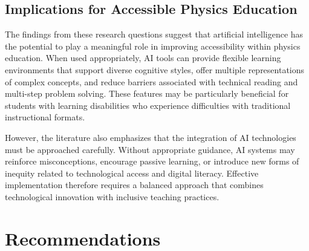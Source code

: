 \documentclass[]{aastex701}
\begin{document}
\subsection{Implications for Accessible Physics Education}

The findings from these research questions suggest that artificial intelligence has the potential to play a meaningful role in improving accessibility within physics education. When used appropriately, AI tools can provide flexible learning environments that support diverse cognitive styles, offer multiple representations of complex concepts, and reduce barriers associated with technical reading and multi-step problem solving. These features may be particularly beneficial for students with learning disabilities who experience difficulties with traditional instructional formats.

However, the literature also emphasizes that the integration of AI technologies must be approached carefully. Without appropriate guidance, AI systems may reinforce misconceptions, encourage passive learning, or introduce new forms of inequity related to technological access and digital literacy. Effective implementation therefore requires a balanced approach that combines technological innovation with inclusive teaching practices.


\section{Recommendations}
\end{document}
